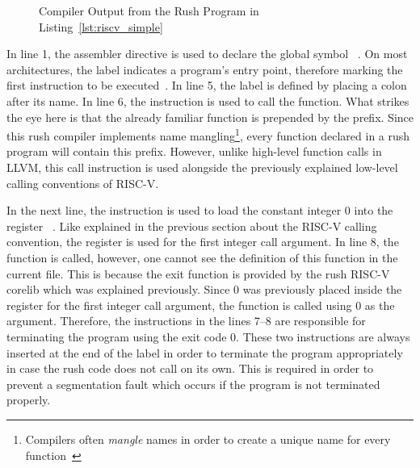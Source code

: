 
\begin{wrapfigure}{L}{0.5\textwidth}
	\centering
	\caption{Compiler Output from the Rush Program in Listing~\ref{lst:riscv_simple}}\label{lst:riscv_simple_asm}
\end{wrapfigure}

In line 1, the  assembler directive is used to declare the global symbol ~\cite[p.~36]{Patterson2017}.
On most architectures, the  label indicates a program's entry point, therefore marking the first instruction to be executed~\cite[p.~19]{Zhirkov2017-wk}.
In line 5, the  label is defined by placing a colon after its name.
In line 6, the  instruction is used to call the  function.
What strikes the eye here is that the already familiar  function is prepended by the  prefix.
Since this rush compiler implements name mangling\footnote{Compilers often \emph{mangle} names in order to create a unique name for every function~\cite[pp.~119-120]{Levine2000}},
every function declared in a rush program will contain this prefix.
However, unlike high-level function calls in LLVM, this call instruction is used alongside the previously explained low-level calling conventions of RISC-V.

In the next line, the  instruction is used to load the constant integer 0 into the register ~\cite[reference card]{Patterson2017}.
Like explained in the previous section about the RISC-V calling convention,
the register  is used for the first integer call argument.
In line 8, the  function is called, however, one cannot see the definition of this function in the current file.
This is because the exit function is provided by the rush RISC-V corelib which was explained previously.
Since 0 was previously placed inside the register for the first integer call argument, the  function is called using 0 as the argument.
Therefore, the instructions in the lines 7--8 are responsible for terminating the program using the exit code 0.
These two instructions are always inserted at the end of the  label in order to terminate the program appropriately in case the rush code does not call  on its own.
This is required in order to prevent a segmentation fault which occurs if the program is not terminated properly.

